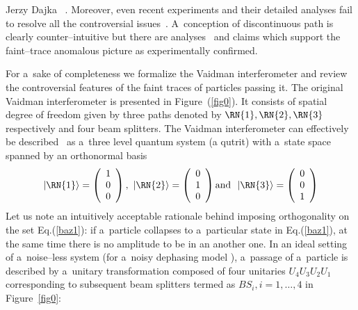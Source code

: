 \begin{artengenv}{Jerzy Dajka}
~\parencite{PhysRevA.91.012103,PhysRevA.93.036103,PhysRevA.93.017801,Vaidman_2018,PhysRevA.92.023829, Hashmi_2016,Hashmi_2018,elitzur}. Moreover, even recent experiments and their detailed analyses fail to resolve all the controversial issues~\parencite{PhysRevLett.111.240402,10.3389/fphy.2015.00047,10.3389/fphy.2015.00048,Sponar_2019,PhysRevA.95.042121,PhysRevA.97.052111, PhysRevA.97.052111,PhysRevA.89.033825,elitzur,WIESNIAK20182565}.  
A~conception of
discontinuous path is clearly counter--intuitive but there are analyses~\parencite{e20110854,PhysRevA.101.052119} and claims which support the faint--trace anomalous picture as experimentally confirmed.  


For a~sake of completeness we formalize the Vaidman interferometer and review the controversial features of the faint traces of particles passing it. The original Vaidman interferometer is presented in Figure~(\ref{fig0}). It consists of spatial degree of freedom given by three paths denoted by $\RN{1},\RN{2},\RN{3}$ respectively and four beam splitters. The Vaidman interferometer can effectively be described~\parencite{PhysRevA.96.022126,PhysRevA.99.026104,PhysRevA.99.026103,scirep} as a~three level quantum system (a qutrit) with a~state space spanned by an orthonormal basis
%
\begin{equation}\label{baz1}
|\RN{1}\rangle=\left(\begin{array}{c} 1 \\ 0 \\ 0   
\end{array}\right),\,\,|\RN{2}\rangle=\left(\begin{array}{c} 0 \\ 1 \\ 0   
\end{array}\right)  \mbox{and}\,\,\,\, |\RN{3}\rangle=\left(\begin{array}{c} 0 \\ 0 \\ 1   
\end{array}\right)
\end{equation}
%
Let us note an intuitively acceptable rationale behind imposing orthogonality on the set Eq.(\ref{baz1}): if a~particle collapses to a~particular state in Eq.(\ref{baz1}), at the same time there is no amplitude to be in an another one.  
%
In an ideal setting of a~noise--less system (for a~noisy dephasing model \parencite[cf.][]{scirep}), a~passage of a~particle is described by a~unitary transformation composed of four unitaries $U_4U_3U_2U_1$ corresponding to subsequent beam splitters termed as $BS_{i}, i=1, \ldots, 4$ in Figure~\ref{fig0}:

\end{artengenv}
